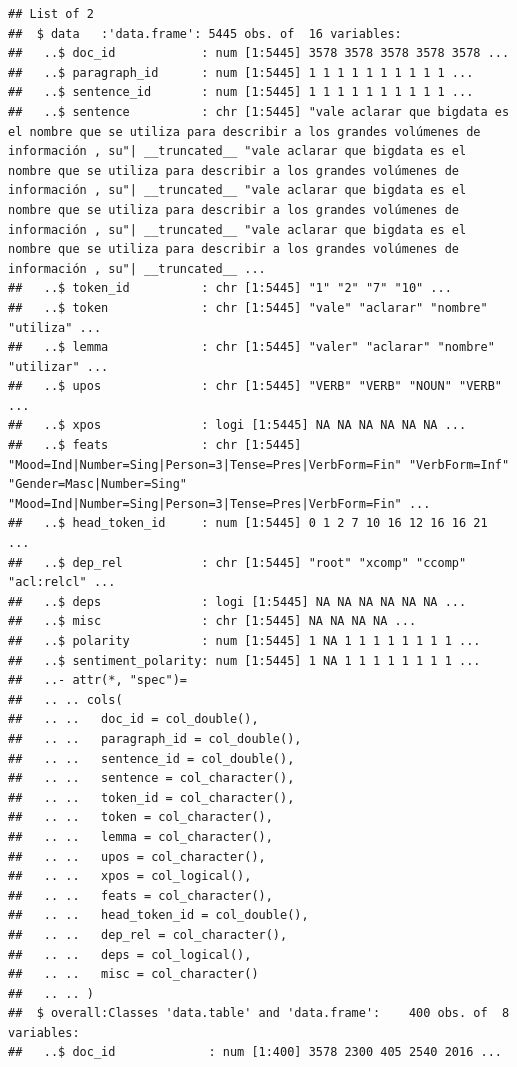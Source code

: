\documentclass[
]{book}
\begin{document}
\begin{verbatim}
## List of 2
##  $ data   :'data.frame': 5445 obs. of  16 variables:
##   ..$ doc_id            : num [1:5445] 3578 3578 3578 3578 3578 ...
##   ..$ paragraph_id      : num [1:5445] 1 1 1 1 1 1 1 1 1 1 ...
##   ..$ sentence_id       : num [1:5445] 1 1 1 1 1 1 1 1 1 1 ...
##   ..$ sentence          : chr [1:5445] "vale aclarar que bigdata es el nombre que se utiliza para describir a los grandes volúmenes de información , su"| __truncated__ "vale aclarar que bigdata es el nombre que se utiliza para describir a los grandes volúmenes de información , su"| __truncated__ "vale aclarar que bigdata es el nombre que se utiliza para describir a los grandes volúmenes de información , su"| __truncated__ "vale aclarar que bigdata es el nombre que se utiliza para describir a los grandes volúmenes de información , su"| __truncated__ ...
##   ..$ token_id          : chr [1:5445] "1" "2" "7" "10" ...
##   ..$ token             : chr [1:5445] "vale" "aclarar" "nombre" "utiliza" ...
##   ..$ lemma             : chr [1:5445] "valer" "aclarar" "nombre" "utilizar" ...
##   ..$ upos              : chr [1:5445] "VERB" "VERB" "NOUN" "VERB" ...
##   ..$ xpos              : logi [1:5445] NA NA NA NA NA NA ...
##   ..$ feats             : chr [1:5445] "Mood=Ind|Number=Sing|Person=3|Tense=Pres|VerbForm=Fin" "VerbForm=Inf" "Gender=Masc|Number=Sing" "Mood=Ind|Number=Sing|Person=3|Tense=Pres|VerbForm=Fin" ...
##   ..$ head_token_id     : num [1:5445] 0 1 2 7 10 16 12 16 16 21 ...
##   ..$ dep_rel           : chr [1:5445] "root" "xcomp" "ccomp" "acl:relcl" ...
##   ..$ deps              : logi [1:5445] NA NA NA NA NA NA ...
##   ..$ misc              : chr [1:5445] NA NA NA NA ...
##   ..$ polarity          : num [1:5445] 1 NA 1 1 1 1 1 1 1 1 ...
##   ..$ sentiment_polarity: num [1:5445] 1 NA 1 1 1 1 1 1 1 1 ...
##   ..- attr(*, "spec")=
##   .. .. cols(
##   .. ..   doc_id = col_double(),
##   .. ..   paragraph_id = col_double(),
##   .. ..   sentence_id = col_double(),
##   .. ..   sentence = col_character(),
##   .. ..   token_id = col_character(),
##   .. ..   token = col_character(),
##   .. ..   lemma = col_character(),
##   .. ..   upos = col_character(),
##   .. ..   xpos = col_logical(),
##   .. ..   feats = col_character(),
##   .. ..   head_token_id = col_double(),
##   .. ..   dep_rel = col_character(),
##   .. ..   deps = col_logical(),
##   .. ..   misc = col_character()
##   .. .. )
##  $ overall:Classes 'data.table' and 'data.frame':    400 obs. of  8 variables:
##   ..$ doc_id             : num [1:400] 3578 2300 405 2540 2016 ...

\end{verbatim}
\end{document}
